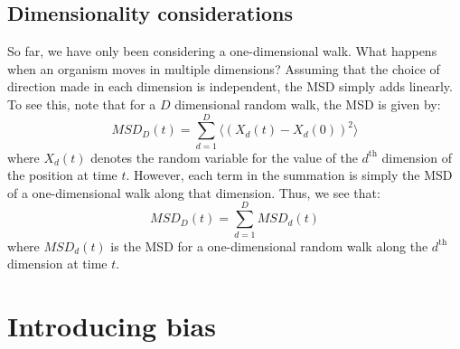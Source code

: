 \subsection{Dimensionality considerations}

So far, we have only been considering a one-dimensional walk. What happens when an organism moves in multiple dimensions? Assuming that the choice of direction made in each dimension is independent, the MSD simply adds linearly. To see this, note that for a $D$ dimensional random walk, the MSD is given by:
\begin{equation*}
	MSD_{D}(t) = \sum\limits_{d=1}^{D}\big\langle(X_{d}(t)-X_{d}(0))^2\big\rangle
\end{equation*}
where $X_{d}(t)$ denotes the random variable for the value of the $d^{\textrm{th}}$ dimension of the position at time $t$. However, each term in the summation is simply the MSD of a one-dimensional walk along that dimension. Thus, we see that:
\begin{equation*}
	MSD_{D}(t) = \sum\limits_{d=1}^{D}MSD_{d}(t)
\end{equation*}
where $MSD_d(t)$ is the MSD for a one-dimensional random walk along the $d^{\textrm{th}}$ dimension at time $t$.

\section{Introducing bias}

